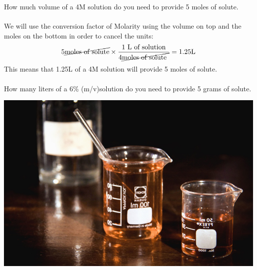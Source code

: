 \documentclass[main.tex]{subfiles}
\begin{document}
\begin{description}
\begin{example} %
How much volume of a 4M solution do you need to provide 5 moles of solute.
\\
\\
We will use the conversion factor of Molarity using the volume on top and the moles on the bottom in order to cancel the units:
\begin{equation*}
5   \cancel{\text{moles of solute}} \times 
\dfrac{\text{1 L of solution}  } {  4\cancel{\text{moles of solute }}} =1.25\text{L}
\end{equation*}
This means that 1.25L of a 4M solution will provide 5 moles of solute.
\\
\faDiamond\ \\
How many liters of a 6\% (m/v)solution do you need to provide 5 grams of solute.
\\
\end{example}%



\begin{marginfigure}%
\includegraphics{chapter9/figure2}
\caption{We dilute by adding water to a stock solution}
\end{marginfigure}%
   
   

\end{description}
\end{document}
